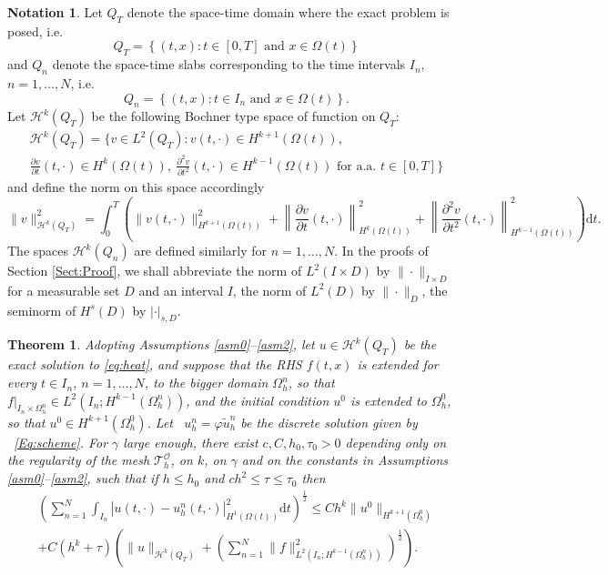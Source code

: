 \documentclass[11pt,a4paper]{article}
\theoremstyle{plain}
\newtheorem{theorem}{Theorem}%
\theoremstyle{definition}
\newtheorem{notation}{Notation}
\theoremstyle{remark}
\numberwithin{equation}{section}
\newcommand{\dt}{\mathrm{d}t}
\begin{document}
\begin{notation} %
Let $Q_T$ denote the space-time domain where the exact problem is posed, i.e.
\[ Q_T = \left\{ (t, x) : t \in [0, T] \text{ and } x \in \Omega (t) \right\} \]
and $Q_n$ denote the space-time slabs corresponding to the time intervals
$I_n$, $n = 1, \ldots, N$, i.e.
\[ Q_n = \left\{ (t, x) : t \in I_n \text{ and }x \in \Omega (t) \right\}. \]
Let $\mathcal{H} ^k (Q_T)$ be the following Bochner type space of function on
$Q_T$:
\begin{multline}\label{Hkspace} \mathcal{H} ^k (Q_T) =
	\bigg\{ v \in L^2 (Q_T) : v (t,
	\cdot) \in H^{k + 1} ( \Omega (t)), \\
	\frac{\partial v}{\partial t} (t, \cdot)
	\in H^k ( \Omega (t)), \
	\frac{\partial^2 v}{\partial t^2} (t, \cdot) \in H^{k	- 1} ( \Omega (t)) \text{ for a.a. }t \in [0, T] \bigg\}
\end{multline}
and define the norm on this space accordingly
\[ \| v \|_{\mathcal{H} ^k (Q_T)}^2 = \int_{0}^T \left( \| v (t, \cdot)
\|_{H^{k + 1} ( \Omega (t))}^2 + \left\| \frac{\partial v}{\partial t} (t,
\cdot) \right\|_{H^k ( \Omega (t))}^2 + \left\| \frac{\partial^2
	v}{\partial t^2} (t, \cdot) \right\|_{H^{k - 1} ( \Omega (t))}^2 \right)
\dt. \]
The spaces $\mathcal{H} ^k (Q_n)$ are defined similarly for $n = 1, \ldots,
N$. {In the proofs of Section \ref{Sect:Proof}, we shall abbreviate the norm of $L^2(I\times D)$ by $\|\cdot\|_{I\times D}$ for a measurable set $D$ and an interval $I$, the norm of $L^2(D)$ by $\|\cdot\|_{D}$, the seminorm of $H^s(D)$ by $|\cdot|_{s,D}$.}
\end{notation}


\begin{theorem}
	\label{thm:error}Adopting Assumptions \ref{asm0}--\ref{asm2},
	let $u \in \mathcal{H} ^k (Q_T)$ be the exact solution to \eqref{eq:heat},
	and suppose that the RHS $f (t, x)$ is extended for every $t \in I_n$, $n =
	1, \ldots, N$, to the bigger domain $\Omega^n_h$, so that $f |_{I_n \times \Omega_h^n}  \in L^2 (I_n ; H^{k - 1} (\Omega^n_h))$, and the
	initial condition $u^0$ is extended to $\Omega^0_h$, so that $u^0 \in H^{k +1} (\Omega^0_h)$. Let \ $u_h^n = \varphi \tilde{u}^n_h$ be the discrete
	solution given by \ \eqref{Eq:scheme}. For $\gamma$ large enough, there
	exist $c, C, h_0, \tau_0 > 0$ depending only on the regularity of the mesh $\mathcal{T}_h^{\mathcal{O}}$, on $k$, on $\gamma$
	and on the constants in Assumptions \ref{asm0}--\ref{asm2},
	such that if $h\leqslant h_0$ and $ch^2\leqslant\tau\leqslant\tau_0$ then
	\begin{multline*}
		\left( \sum_{n = 1}^N \int_{I_n} |u  (t, \cdot) - u_h^n (t, \cdot) |_{H^1
			(\Omega (t))}^2 \dt \right)^{\frac{1}{2}} \leqslant Ch^k \|u^0 \|_{H^{k + 1}
			(\Omega_h^0)}\\
		+ C (h^k + \tau)  \left( \|u\|_{\mathcal{H} ^k (Q_T)} + \left( \sum_{n =
			1}^N \| f \|_{L^2 (I_n ; H^{k - 1} (\Omega^n_h))}^2 \right)^{\frac{1}{2}}
		\right).
	\end{multline*}
\end{theorem}
\end{document}
